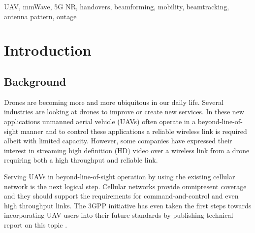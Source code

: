 \documentclass[conference,twocolumn]{IEEEtran}
\begin{document}
\begin{IEEEkeywords}
UAV, mmWave, 5G NR, handovers, beamforming, mobility, beamtracking, antenna pattern, outage
\end{IEEEkeywords}

\section{Introduction}
\subsection{Background}
\par Drones are becoming more and more ubiquitous in our daily life. Several industries are looking at drones to improve or create new services. In these new applications unmanned aerial vehicle (UAVs) often operate in a beyond-line-of-sight manner and to control these applications a reliable wireless link is required albeit with limited capacity. However, some companies have expressed their interest in streaming high definition (HD) video over a wireless link from a drone requiring both a high throughput and reliable link.
\par Serving UAVs in beyond-line-of-sight operation by using the existing cellular network is the next logical step. Cellular networks provide omnipresent coverage and they should support the requirements for command-and-control and even high throughput links. The 3GPP initiative has even taken the first steps towards incorporating UAV users into their future standards by publishing technical report on this topic \cite{3gpp.36.777}.
\end{document}
